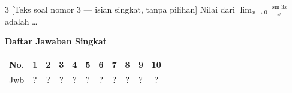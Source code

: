 \documentclass[11pt]{article}
\begin{document}
\begin{soal}{3}
[Teks soal nomor 3 --- isian singkat, tanpa pilihan]
Nilai dari $\displaystyle\lim_{x\to 0}\frac{\sin 3x}{x}$ adalah \ldots
\end{soal}


\clearpage
\begin{center}
  {\bfseries Daftar Jawaban Singkat}\\[0.6em]
  \begin{tabular}{c|*{10}{c}}
    \toprule
    No. & 1 & 2 & 3 & 4 & 5 & 6 & 7 & 8 & 9 & 10 \\
    \midrule
    Jwb & ? & ? & ? & ? & ? & ? & ? & ? & ? & ?  \\
    \bottomrule
  \end{tabular}
\end{center}
\end{document}
